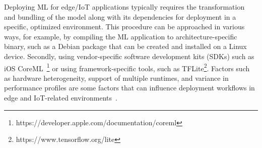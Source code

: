 
Deploying ML for edge/IoT applications typically requires the transformation and bundling of the model along with its dependencies for deployment in a specific, optimized environment. This procedure can be approached in various ways, for example, by compiling the ML application to architecture-specific binary, such as a Debian package that can be created and installed on a Linux device. Secondly, using vendor-specific software development kits (SDKs) such as iOS CoreML~\footnote{https://developer.apple.com/documentation/coreml} or using framework-specific tools, such as TFLite\footnote{https://www.tensorflow.org/lite}. Factors such as hardware heterogeneity, support of multiple runtimes, and variance in performance profiles are some factors that can influence deployment workflows in edge and IoT-related environments~\cite{Wu-FB-edge}.

